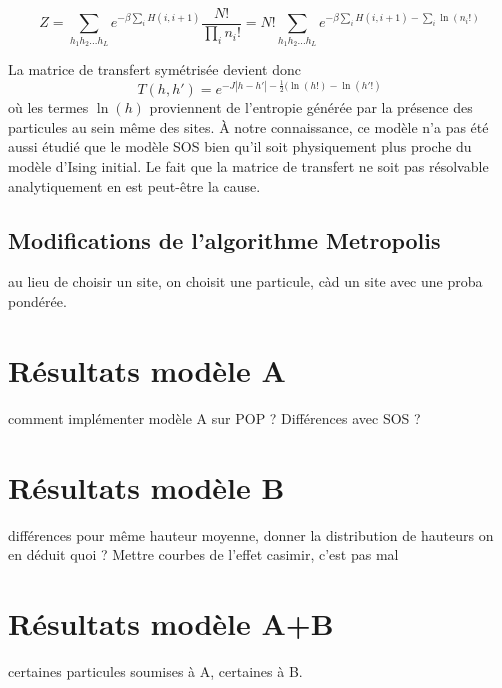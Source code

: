 \begin{equation}
	Z = \sum_{h_1 h_2 ... h_L} e^{- \beta \sum_{i} H(i,i+1)} \frac{N!}{\prod_i n_i!} = N! \sum_{h_1 h_2 ... h_L} e^{- \beta \sum_{i} H(i,i+1) -\sum_i \ln(n_i!)}
\end{equation}

La matrice de transfert symétrisée devient donc
\begin{equation}
	T(h,h') = e^{-J |h-h'| - \frac{1}{2}(\ln(h!)-\ln(h'!)}
\end{equation}
où les termes $\ln(h)$ proviennent de l'entropie générée par la présence des particules au sein même des sites. À notre connaissance, ce modèle n'a pas été aussi étudié que le modèle SOS bien qu'il soit physiquement plus proche du modèle d'Ising initial. Le fait que la matrice de transfert ne soit pas résolvable analytiquement en est peut-être la cause. 
		\subsection{Modifications de l'algorithme Metropolis}
		au lieu de choisir un site, on choisit une particule, càd un site avec une proba pondérée.



	\section{Résultats modèle A}
	comment implémenter modèle A sur POP ? Différences avec SOS ?
	\section{Résultats modèle B}
	différences pour même hauteur moyenne, donner la distribution de hauteurs 
	on en déduit quoi ? 
	Mettre courbes de l'effet casimir, c'est pas mal
	\section{Résultats modèle A+B}
		certaines particules soumises à A, certaines à B. 